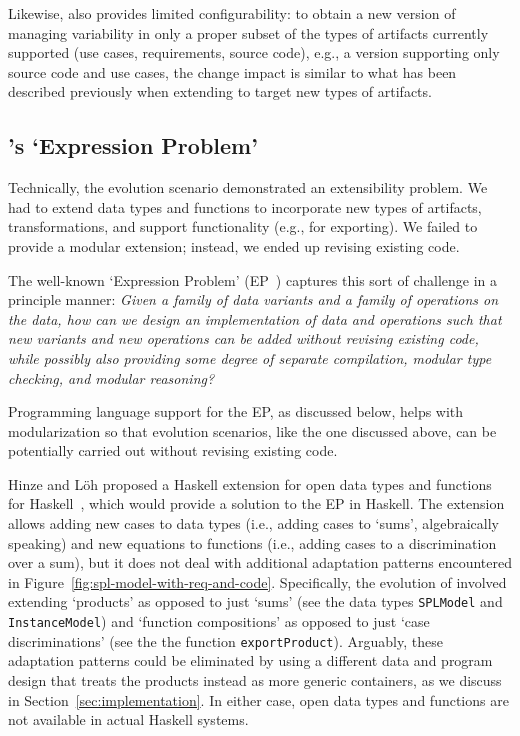 Likewise, \hp{} also provides limited configurability: to obtain a new
version of \hp{} managing variability in only a proper subset of the
types of artifacts currently supported (use cases, requirements,
source code), e.g., a version supporting only source code and use
cases, the change impact is similar to what has been described
previously when extending \hp{} to target new types of artifacts.


\subsection{\hp's `Expression Problem'}
\label{sec:ep}

Technically, the evolution scenario demonstrated an extensibility
problem. We had to extend data types and functions to incorporate new
types of artifacts, transformations, and support functionality (e.g., for
exporting). We failed to provide a modular extension; instead, we
ended up revising existing code.

The well-known `Expression Problem'
(EP~\cite{Wadler98,Lopez-HerrejonBC05}) captures this sort of
challenge in a principle manner: \emph{Given a family of data variants
  and a family of operations on the data, how can we design an
  implementation of data and operations such that new variants and new
  operations can be added without revising existing code, while
  possibly also providing some degree of separate compilation, modular
  type checking, and modular reasoning?}

Programming language support for the EP, as discussed below, helps
with modularization so that evolution scenarios, like the one
discussed above, can be potentially carried out without revising
existing code.

Hinze and L\"oh proposed a Haskell extension for open data types and
functions for Haskell~\cite{LoehH06}, which would provide a solution
to the EP in Haskell. The extension allows adding new cases to data
types (i.e., adding cases to `sums', algebraically speaking) and new
equations to functions (i.e., adding cases to a discrimination over a
sum), but it does not deal with additional adaptation patterns
encountered in
Figure~\ref{fig:spl-model-with-req-and-code}. Specifically, the
evolution of \hp{} involved extending `products' as opposed to just
`sums' (see the data types \texttt{SPLModel} and
\texttt{InstanceModel}) and `function compositions' as opposed to just
`case discriminations' (see the the function \texttt{exportProduct}).
Arguably, these adaptation patterns could be eliminated by using a
different data and program design that treats the products instead as
more generic containers, as we discuss in
Section~\ref{sec:implementation}. In either case, open data types and
functions are not available in actual Haskell systems.


